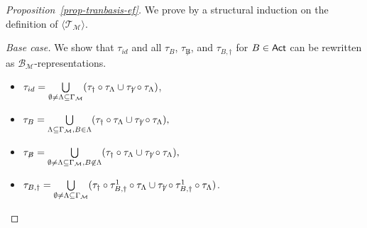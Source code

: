\documentclass[preprint,12pt]{elsarticle}
\newcommand\Mm{{\mathcal{M} }}
\newcommand\act{{\sf Act}}
\newcommand{\id}{\mathsf{id}}
\newcommand\Aut{{\mathfrak{A} }}
\newcommand\TranSet{{\mathscr{T} }}
\newcommand\Tranbasis{{\mathscr{B} }}
\begin{document}
\begin{proof}[Proposition~\ref{prop-tranbasis-ef}]
	We prove by a structural induction on the definition of $\langle \TranSet_\Mm \rangle$.
	
	
	\smallskip
	\noindent \emph{Base case.} We show that $\tau_{id}$ and all $\tau_{B}$, $\tau_{\not B}$, and $\tau_{B, \dag}$ for $B \in \act$ can be rewritten as $\Tranbasis_\Mm$-representations.
	\begin{itemize}
	\item $\tau_{id} = \bigcup\limits_{\emptyset \neq \Lambda  \subseteq\Gamma_{\Mm}} (\tau_\dag \circ \tau_{\Lambda} \cup \tau_{{\not \dag}} \circ \tau_{\Lambda})$, 
	\item $ \tau_{B} = \bigcup\limits_{ \Lambda \subseteq\Gamma_{\Mm}, B \in \Lambda} (\tau_\dag \circ \tau_{\Lambda} \cup \tau_{{\not \dag}} \circ \tau_{\Lambda}),$
	\item	$ \tau_{\not B} =
	\bigcup\limits_{\emptyset \neq \Lambda \subseteq\Gamma_{\Mm}, B \not \in \Lambda} (\tau_\dag \circ \tau_{\Lambda} \cup \tau_{\not \dag} \circ \tau_{\Lambda}),$  
	\item $\tau_{B,\dag} = \bigcup\limits_{\emptyset \neq \Lambda \subseteq \Gamma_{\Mm}}(\tau_{\dag} \circ \tau_{B,\dag}^1\circ\tau_{\Lambda} \cup \tau_{\not \dag} \circ \tau_{B,\dag}^1\circ\tau_{\Lambda} )$.
	\end{itemize}
	

\end{proof}
\end{document}
